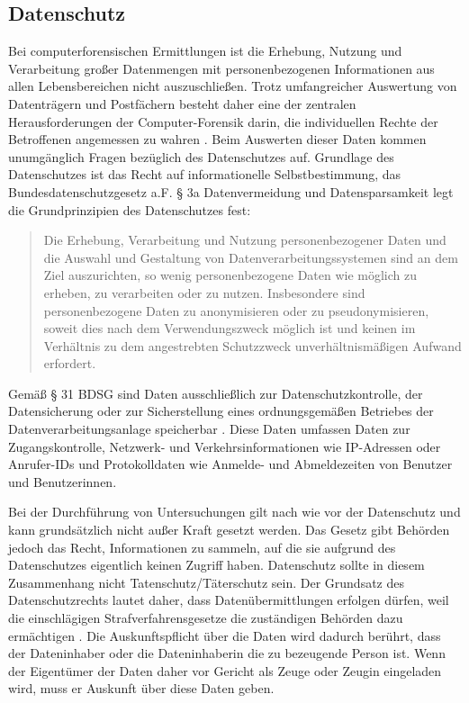 \documentclass[12pt,DIV=14, version=first, BCOR=10mm,a4paper,twoside,parskip=half-,headsepline,headinclude]{scrartcl}
\begin{document}
    \subsection{Datenschutz}
    Bei computerforensischen Ermittlungen ist die Erhebung, Nutzung und Verarbeitung großer Datenmengen mit personenbezogenen Informationen aus allen Lebensbereichen nicht auszuschließen. Trotz umfangreicher Auswertung von Datenträgern und Postfächern besteht daher eine der zentralen Herausforderungen der Computer-Forensik darin, die individuellen Rechte der Betroffenen angemessen zu wahren \cite[vgl. S. 72]{texbook03}.
    Beim Auswerten dieser Daten kommen unumgänglich Fragen bezüglich des Datenschutzes auf.
    Grundlage des Datenschutzes ist das Recht auf informationelle Selbstbestimmung, das Bundesdatenschutzgesetz a.F. § 3a Datenvermeidung und Datensparsamkeit legt die Grundprinzipien des Datenschutzes fest:
    \begin{quote}
        \glqq
        Die Erhebung, Verarbeitung und Nutzung personenbezogener Daten und die Auswahl und Gestaltung von Datenverarbeitungssystemen sind an dem Ziel auszurichten, so wenig personenbezogene Daten wie möglich zu erheben, zu verarbeiten oder zu nutzen. Insbesondere sind personenbezogene Daten zu anonymisieren oder zu pseudonymisieren, soweit dies nach dem Verwendungszweck möglich ist und keinen im Verhältnis zu dem angestrebten Schutzzweck unverhältnismäßigen Aufwand erfordert.
        \grqq
        \cite[S. 1]{bg3a}
    \end{quote}
    Gemäß § 31 BDSG sind Daten ausschließlich zur Datenschutzkontrolle, der Datensicherung oder zur Sicherstellung eines ordnungsgemäßen Betriebes der Datenverarbeitungsanlage speicherbar \cite[vgl. S. 1]{bg31}. Diese Daten umfassen Daten zur Zugangskontrolle, Netzwerk- und Verkehrsinformationen wie IP-Adressen oder Anrufer-IDs und Protokolldaten wie Anmelde- und Abmeldezeiten von Benutzer und Benutzerinnen.
    
    Bei der Durchführung von Untersuchungen gilt nach wie vor der Datenschutz und kann grundsätzlich nicht außer Kraft gesetzt werden. Das Gesetz gibt Behörden jedoch das Recht, Informationen zu sammeln, auf die sie aufgrund des Datenschutzes eigentlich keinen Zugriff haben. Datenschutz sollte in diesem Zusammenhang nicht Tatenschutz/Täterschutz sein. Der Grundsatz des Datenschutzrechts lautet daher, dass Datenübermittlungen erfolgen dürfen, weil die einschlägigen Strafverfahrensgesetze die zuständigen Behörden dazu ermächtigen \cite[vgl. S. 83]{texbook01}.
    Die Auskunftspflicht über die Daten wird dadurch berührt, dass der Dateninhaber oder die Dateninhaberin die zu bezeugende Person ist. Wenn der Eigentümer der Daten daher vor Gericht als Zeuge oder Zeugin eingeladen wird, muss er Auskunft über diese Daten geben.
    
\end{document}
